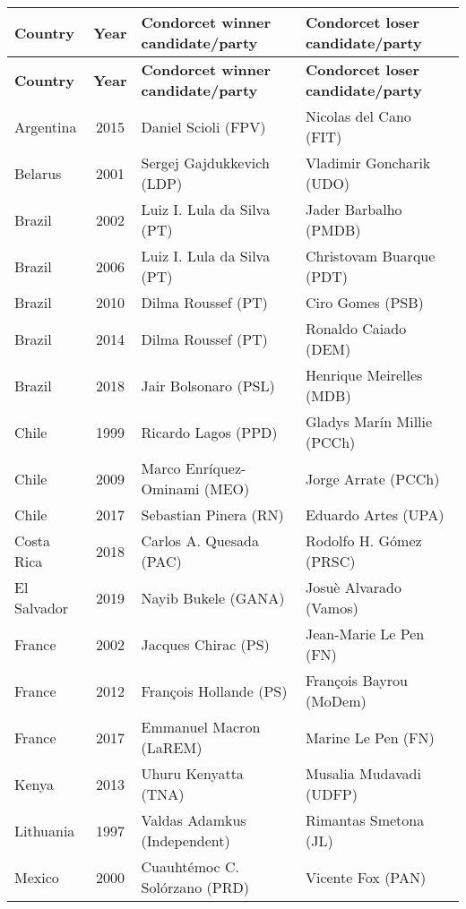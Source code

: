 \scriptsize{
\begin{longtable}{|l|c|l|l|} \toprule 
\textbf{Country} & \textbf{Year} & \textbf{Condorcet winner candidate/party} & \textbf{Condorcet loser candidate/party} \\\midrule  \endfirsthead	\midrule
\textbf{Country} & \textbf{Year} & \textbf{Condorcet winner candidate/party} & \textbf{Condorcet loser candidate/party} \\ \midrule \endhead \midrule \endfoot \bottomrule \endlastfoot \midrule 
Argentina     & 2015 & Daniel Scioli (FPV)  &  Nicolas del Cano (FIT)      \\
Belarus & 2001 & Sergej Gajdukkevich (LDP) & Vladimir Goncharik (UDO)  \\
Brazil     & 2002 &   Luiz I. Lula da Silva (PT) &  Jader Barbalho (PMDB)  \\ 
Brazil     & 2006 &  Luiz I. Lula da Silva (PT)  &  Christovam Buarque (PDT) \\ 
Brazil     & 2010 &  Dilma Roussef (PT)   &  Ciro Gomes (PSB)  \\ 
Brazil     & 2014 & Dilma Roussef (PT)  &   Ronaldo Caiado (DEM)        \\ 
Brazil     & 2018 &   Jair Bolsonaro (PSL)&  Henrique Meirelles (MDB)  \\ 
 Chile      & 1999 &   Ricardo Lagos (PPD) &   Gladys Mar\'in Millie (PCCh) \\ 
 Chile     & 2009 &   Marco Enr\'iquez-Ominami (MEO)   &  Jorge Arrate (PCCh)  \\ 
 Chile     & 2017 &  Sebastian Pinera (RN)   &  Eduardo Artes (UPA)  \\ 
Costa Rica & 2018 &   Carlos A. Quesada (PAC) &   Rodolfo H. G\'omez (PRSC) \\ 
%
El Salvador & 2019 & Nayib Bukele (GANA) & Josu\`e Alvarado (Vamos) \\
France & 2002 & Jacques Chirac (PS) & Jean-Marie Le Pen (FN)\\ 
France & 2012 &   Fran\c{c}ois Hollande (PS)   &   Fran\c{c}ois Bayrou (MoDem)  \\ 
France & 2017 &   Emmanuel Macron (LaREM)    &   Marine Le Pen (FN) \\ 
Kenya     & 2013 &   Uhuru Kenyatta (TNA)    &  Musalia Mudavadi (UDFP)    \\ 
Lithuania & 1997 & Valdas Adamkus (Independent)      & Rimantas Smetona (JL)    \\ 
Mexico     & 2000 & Cuauht\'{e}moc C. Sol\'{o}rzano  (PRD)  & Vicente Fox (PAN)     \\ 

\end{longtable}}
